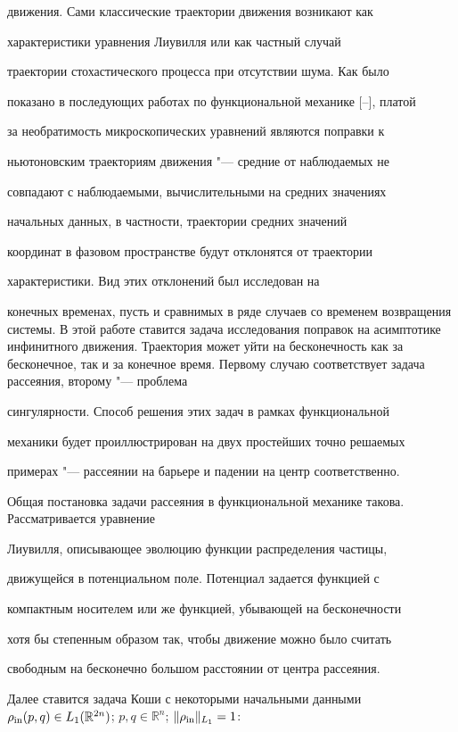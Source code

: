  движения. Сами классические траектории движения возникают как

 характеристики уравнения Лиувилля или как частный  случай

 траектории стохастического процесса при отсутствии шума. Как было

 показано в последующих работах по функциональной механике [--], платой

 за необратимость микроскопических уравнений являются поправки к

 ньютоновским траекториям движения "--- средние от наблюдаемых не

 совпадают с наблюдаемыми, вычислительными на средних значениях

 начальных данных, в частности, траектории средних значений

 координат в фазовом пространстве будут отклонятся от траектории

 характеристики. Вид  этих отклонений был исследован  на

 конечных временах, пусть и сравнимых в ряде случаев со временем возвращения системы. В этой работе ставится задача исследования поправок на асимптотике инфинитного движения. Траектория может уйти на бесконечность как за бесконечное, так и за конечное время. Первому случаю соответствует задача рассеяния, второму "--- проблема

 сингулярности. Способ решения этих задач в рамках функциональной

 механики будет проиллюстрирован на двух простейших точно решаемых

 примерах "--- рассеянии на барьере и падении на центр соответственно.





 Общая постановка задачи рассеяния  в функциональной механике такова. Рассматривается уравнение

 Лиувилля, описывающее эволюцию функции распределения  частицы,

 движущейся в потенциальном поле. Потенциал задается функцией с

 компактным носителем или же функцией, убывающей на бесконечности

 хотя бы степенным образом так, чтобы движение можно было считать

 свободным на бесконечно большом расстоянии от центра рассеяния.

 Далее ставится задача Коши  с некоторыми начальными данными $\rho_{\rm in}(p,q)\in L_1(\mathbb{R}^{2n})$; $p,q \in \mathbb{R}^{n}$; $\|\rho_{\rm in}\|_{L_1}=1$:

